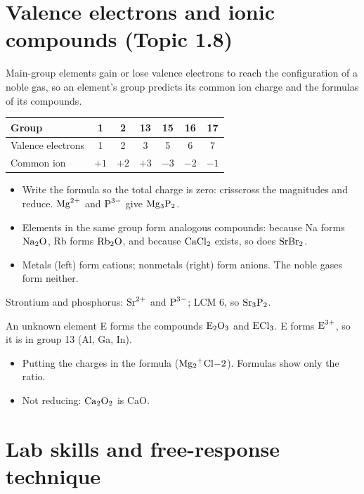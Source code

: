 \documentclass[11pt]{article}
\begin{document}
\section{Valence electrons and ionic compounds (Topic 1.8)}\label{t:1.8}
Main-group elements gain or lose valence electrons to reach the configuration of a noble gas, so an element's group predicts its common ion charge and the formulas of its compounds.
\begin{center}
\begin{tabular}{lcccccc}\toprule
Group & 1 & 2 & 13 & 15 & 16 & 17 \\ \midrule
Valence electrons & 1 & 2 & 3 & 5 & 6 & 7 \\
Common ion & $+1$ & $+2$ & $+3$ & $-3$ & $-2$ & $-1$ \\ \bottomrule
\end{tabular}
\end{center}
\begin{itemize}
\item Write the formula so the total charge is zero: crisscross the magnitudes and reduce. $\ce{Mg^2+}$ and $\ce{P^3-}$ give $\ce{Mg3P2}$.
\item Elements in the same group form analogous compounds: because Na forms $\ce{Na2O}$, Rb forms $\ce{Rb2O}$, and because $\ce{CaCl2}$ exists, so does $\ce{SrBr2}$.
\item Metals (left) form cations; nonmetals (right) form anions. The noble gases form neither.
\end{itemize}

 Strontium and phosphorus: $\ce{Sr^2+}$ and $\ce{P^3-}$; LCM 6, so $\ce{Sr3P2}$.

 An unknown element E forms the compounds $\ce{E2O3}$ and $\ce{ECl3}$. E forms $\ce{E^3+}$, so it is in group 13 (Al, Ga, In).

\errorsh
\begin{itemize}
\item Putting the charges in the formula ($\ce{Mg2+Cl-2}$). Formulas show only the ratio.
\item Not reducing: $\ce{Ca2O2}$ is CaO.
\end{itemize}

\section{Lab skills and free-response technique}\label{t:lab}
\end{document}
